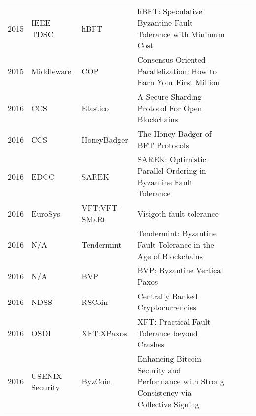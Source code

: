 \documentclass{article}
\begin{document}
\begin{landscape}
\begin{longtable}[c]{llll|l|l|l|}
2015 & IEEE TDSC         & hBFT                    & hBFT: Speculative Byzantine Fault Tolerance with Minimum Cost                             &            &          &              \\ \cline{5-7} 
2015 & Middleware        & COP                     & Consensus-Oriented Parallelization: How to Earn Your First Million                        &            &          &              \\ \cline{5-7} 
2016 & CCS               & Elastico                & A Secure Sharding Protocol For Open Blockchains                                           &            &          &              \\ \cline{5-7} 
2016 & CCS               & HoneyBadger             & The Honey Badger of BFT Protocols                                                         &            &          &              \\ \cline{5-7} 
2016 & EDCC              & SAREK                   & SAREK: Optimistic Parallel Ordering in Byzantine Fault Tolerance                          &            &          &              \\ \cline{5-7} 
2016 & EuroSys           & VFT:VFT-SMaRt           & Visigoth fault tolerance                                                                  &            &          &              \\ \cline{5-7} 
2016 & N/A               & Tendermint              & Tendermint: Byzantine Fault Tolerance in the Age of Blockchains                           &            &          &              \\ \cline{5-7} 
2016 & N/A               & BVP                     & BVP: Byzantine Vertical Paxos                                                             &            &          &              \\ \cline{5-7} 
2016 & NDSS              & RSCoin                  & Centrally Banked Cryptocurrencies                                                         &            &          &              \\ \cline{5-7} 
2016 & OSDI              & XFT:XPaxos              & XFT: Practical Fault Tolerance beyond Crashes                                             &            &          &              \\ \cline{5-7} 
2016 & USENIX Security   & ByzCoin                 & Enhancing Bitcoin Security and Performance with Strong Consistency via Collective Signing &            &          &              \\ \cline{5-7} 

\end{longtable}
\end{landscape}
\end{document}
